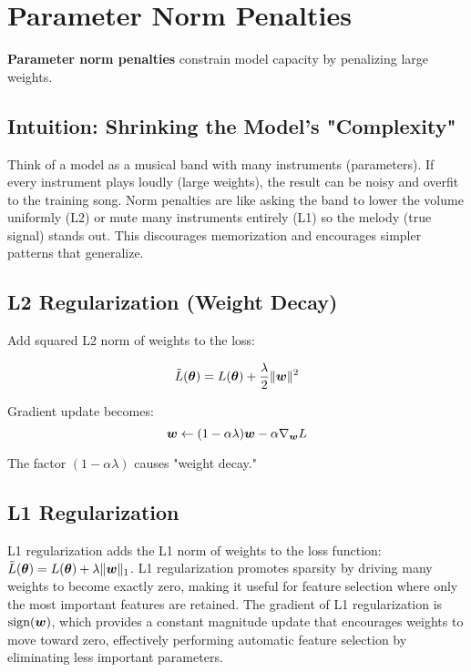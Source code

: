 
\section{Parameter Norm Penalties }
\label{sec:parameter-penalties}

\textbf{Parameter norm penalties} constrain model capacity by penalizing large weights.

\subsection{Intuition: Shrinking the Model's "Complexity"}

Think of a model as a musical band with many instruments (parameters). If every instrument plays loudly (large weights), the result can be noisy and overfit to the training song. Norm penalties are like asking the band to lower the volume uniformly (L2) or mute many instruments entirely (L1) so the melody (true signal) stands out. This discourages memorization and encourages simpler patterns that generalize.

\subsection{L2 Regularization (Weight Decay)}

Add squared L2 norm of weights to the loss:

\begin{equation}
\tilde{L}(\boldsymbol{\theta}) = L(\boldsymbol{\theta}) + \frac{\lambda}{2} \|\boldsymbol{w}\|^2
\end{equation}

Gradient update becomes:
\begin{equation}
\boldsymbol{w} \leftarrow (1 - \alpha\lambda)\boldsymbol{w} - \alpha \nabla_{\boldsymbol{w}} L
\end{equation}

The factor $(1 - \alpha\lambda)$ causes "weight decay."

\subsection{L1 Regularization}

L1 regularization adds the L1 norm of weights to the loss function: $\tilde{L}(\boldsymbol{\theta}) = L(\boldsymbol{\theta}) + \lambda \|\boldsymbol{w}\|_1$. L1 regularization promotes sparsity by driving many weights to become exactly zero, making it useful for feature selection where only the most important features are retained. The gradient of L1 regularization is $\text{sign}(\boldsymbol{w})$, which provides a constant magnitude update that encourages weights to move toward zero, effectively performing automatic feature selection by eliminating less important parameters.


